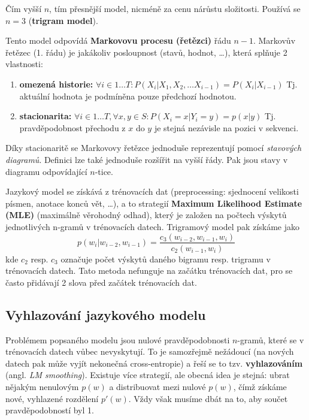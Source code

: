 \documentclass[11pt]{report} %
\numberwithin{equation}{section}
\begin{document}
Čím vyšší $n$, tím přesnější model, nicméně za cenu nárůstu složitosti. Používá se $n = 3$ (\textbf{trigram model}). 

Tento model odpovídá \textbf{Markovovu procesu (řetězci)} řádu $n-1$. Markovův řetězec (1. řádu) je jakákoliv posloupnost (stavů, hodnot, \dots), která splňuje 2 vlastnosti:
\begin{enumerate}
	
	
	\item \textbf{omezená historie:} $\forall i \in 1\dots T : P(X_i|X_1,X_2,\dots X_{i-1}) = P(X_i|X_{i-1})$
	Tj. aktuální hodnota je podmíněna pouze předchozí hodnotou.
	\item \textbf{stacionarita:} $\forall i \in 1\dots T, \forall x,y \in S : P(X_i = x | Y_i = y) = p(x|y)$ 
	Tj. pravděpodobnost přechodu z $x$ do $y$ je stejná nezávisle na pozici v sekvenci.
\end{enumerate}
Díky stacionaritě se Markovovy řetězce jednoduše reprezentují pomocí \textit{stavových diagramů}. Definici lze také jednoduše rozšířit na vyšší řády. Pak jsou stavy v diagramu odpovídající $n$-tice.

Jazykový model se získává z trénovacích dat (preprocessing: sjednocení velikosti písmen, anotace konců vět, \dots), a to strategií \textbf{Maximum Likelihood Estimate (MLE)} (maximálně věrohodný odhad), který je založen na počtech výskytů jednotlivých n-gramů v trénovacích datech. Trigramový model pak získáme jako
$$p(w_i|w_{i-2},w_{i-1}) = \frac{c_3(w_{i-2}, w_{i-1}, w_{i})}{c_2(w_{i-1}, w_{i})}$$
kde $c_2$ resp. $c_3$ označuje počet výskytů daného bigramu resp. trigramu v trénovacích datech. Tato metoda nefunguje na začátku trénovacích dat, pro se často přidávají 2  slova před začátek trénovacích dat. 

\subsection{Vyhlazování jazykového modelu}
Problémem popsaného modelu jsou nulové pravděpodobnosti $n$-gramů, které se v trénovacích datech vůbec nevyskytují. To je samozřejmě nežádoucí (na nových datech pak může vyjít nekonečná cross-entropie) a řeší se to tzv. \textbf{vyhlazováním} (angl. \textit{LM smoothing}). Existuje více strategií, ale obecná idea je stejná: ubrat nějakým nenulovým $p(w)$ a distribuovat mezi nulové $p(w)$, čímž získáme nové, vyhlazené rozdělení $p'(w)$. Vždy však musíme dbát na to, aby součet pravděpodobností byl 1.
\end{document}

